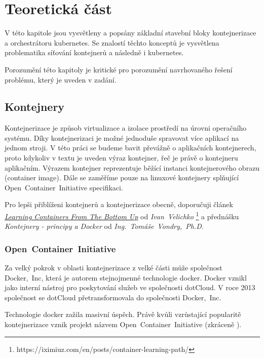\chapter{Teoretická část}
\begin{chapterabstract}
V této kapitole jsou vysvětleny a popsány základní stavební bloky kontejnerizace a orchestrátoru kubernetes. Se znalostí těchto konceptů je vysvětlena problematika síťování kontejnerů a následně i kubernetes.  

Porozumění této kapitoly je kritické pro porozumění navrhovaného řešení problému, který je uveden v zadání.
\end{chapterabstract}

\section{Kontejnery}
Kontejnerizace je způsob virtualizace a izolace prostředí na úrovni operačního systému. Díky kontejnerizaci je možné jednoduše spravovat více aplikací na jednom stroji. V této práci se budeme bavit převážně o aplikačních kontejnerech, proto kdykoliv v textu je uveden výraz kontejner, řeč je právě o kontejneru aplikačním. Výrazem kontejner reprezentuje běžící instanci kontejnerového obrazu (container image). Dále se zaměříme pouze na linuxové kontejnery splňující Open~Container~Initiative specifikaci.

Pro lepši přiblíženi kontejnerů a kontejnerizace obecně, doporučuji článek \href{https://iximiuz.com/en/posts/container-learning-path/}{\textit{Learning Containers From The Bottom Up}}  od \textit{Ivan~Velichko} \footnote{https://iximiuz.com/en/posts/container-learning-path/} a přednášku \textit{Kontejnery - principy a Docker} od \textit{Ing.~Tomáše~Vondry,~Ph.D.}
\subsection{Open~Container~Initiative}
Za velký pokrok v oblasti kontejnerizace z velké části může společnost Docker,~Inc, která je autorem stejnojmenné technologie docker. Docker vznikl jako interní nástroj pro poskytování služeb ve společnosti dotCloud. V roce 2013 společnost se dotCloud přetransformovala do společnosti Docker,~Inc. \cite{poulton_2020_docker}

Technologie docker zažila masivní úspěch. Právě kvůli vzrůstající popularitě kontejnerizace vznik projekt názvem Open~Container~Initiative (zkráceně ).

